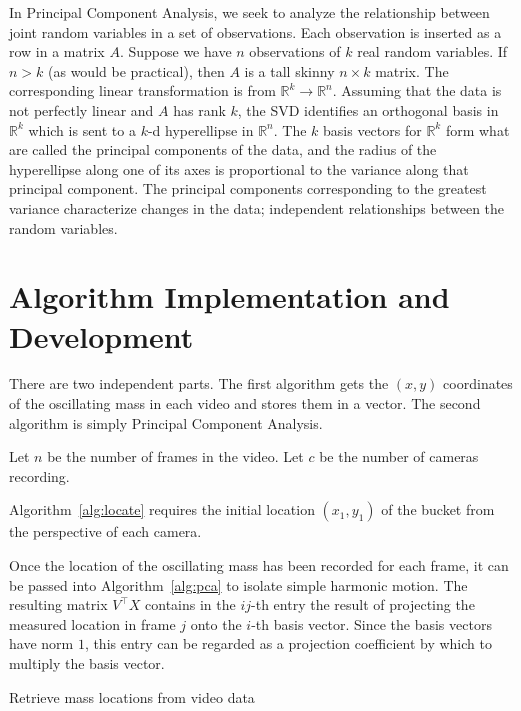 \documentclass{article}
\begin{document}
In Principal Component Analysis, we seek to analyze the relationship between joint random variables in a set of observations. Each observation is inserted as a row in a matrix $A$. Suppose we have $n$ observations of $k$ real random variables. If $n > k$ (as would be practical), then $A$ is a tall skinny $n \times k$ matrix. The corresponding linear transformation is from $\mathbb{R}^k \rightarrow \mathbb{R}^n$. Assuming that the data is not perfectly linear and $A$ has rank $k$, the SVD identifies an orthogonal basis in $\mathbb{R}^k$ which is sent to a $k$-d hyperellipse in $\mathbb{R}^n$. The $k$ basis vectors for $\mathbb{R}^k$ form what are called the principal components of the data, and the radius of the hyperellipse along one of its axes is proportional to the variance along that principal component. The principal components corresponding to the greatest variance characterize changes in the data; independent relationships between the random variables.


\section{Algorithm Implementation and Development}
There are two independent parts. The first algorithm gets the $(x,y)$ coordinates of the oscillating mass in each video and stores them in a vector. The second algorithm is simply Principal Component Analysis.

Let $n$ be the number of frames in the video. Let $c$ be the number of cameras recording.

Algorithm~\ref{alg:locate} requires the initial location $(x_1,y_1)$ of the bucket from the perspective of each camera. 

Once the location of the oscillating mass has been recorded for each frame, it can be passed into Algorithm~\ref{alg:pca} to isolate simple harmonic motion. The resulting matrix $V^\top X$ contains in the $ij$-th entry the result of projecting the measured location in frame $j$ onto the $i$-th basis vector. Since the basis vectors have norm $1$, this entry can be regarded as a projection coefficient by which to multiply the basis vector.

\begin{algorithm}[!h]
	\begin{algorithmic}
		\ENDFOR{}
		\ENDFOR{}
	\end{algorithmic}
\caption{Retrieve mass locations from video data}
\label{alg:locate}
\end{algorithm}
\end{document}
